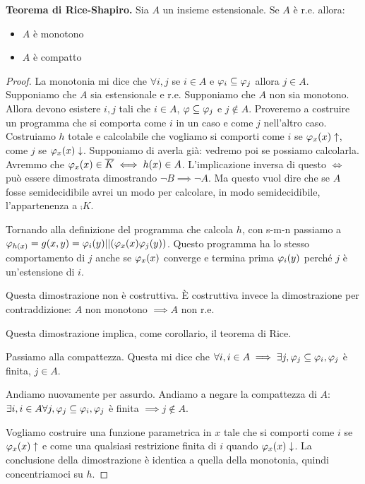\begin{thm}
    \textbf{Teorema di Rice-Shapiro. }Sia $A$ un insieme estensionale. Se $A$ è r.e. allora:
    \begin{itemize}
        \item $A$ è monotono
        \item $A$ è compatto
    \end{itemize}
\end{thm}
\begin{proof}
    La monotonia mi dice che $\forall i,j$ se $i \in A$ e $\varphi_{i} \subseteq \varphi_{j}$ allora $j \in
    A$. Supponiamo che $A$ sia estensionale e r.e. Supponiamo che $A$ non sia monotono. Allora
    devono esistere $i,j$ tali che $i \in A$, $\varphi \subseteq \varphi_{j}$ e $j \notin A$. Proveremo a
    costruire un programma che si comporta come $i$ in un caso e come $j$ nell'altro caso.
    Costruiamo $h$ totale e calcolabile che vogliamo si comporti come $i$ se $\varphi_{x}(x) \uparrow$,
    come $j$ se $\varphi_{x}(x) \downarrow$. Supponiamo di averla già: vedremo poi se possiamo
    calcolarla. Avremmo che $\varphi_{x}(x) \in \overline{K} \iff h(x) \in A$. L'implicazione inversa di questo
    $\iff$ può essere dimostrata dimostrando $\lnot B \implies \lnot A$. Ma questo vuol dire che se
    $A$ fosse semidecidibile avrei un modo per calcolare, in modo semidecidibile, l'appartenenza a
    $\comp{K}$. 

    Tornando alla definizione del programma che calcola $h$, con s-m-n passiamo a $\varphi_{h(x)} = g(x,y)
    = \varphi_{i}(y) || (\varphi_{x}(x)\varphi_{j}(y))$. Questo programma ha lo stesso comportamento di $j$ anche se
    $\varphi_{x}(x)$ converge e termina prima $\varphi_{i}(y)$ perché $j$ è un'estensione di $i$. 

    Questa dimostrazione non è costruttiva. È costruttiva invece la dimostrazione per
    contraddizione: $A$ non monotono $\implies A$ non r.e.

    Questa dimostrazione implica, come corollario, il teorema di Rice.

    Passiamo alla compattezza. Questa mi dice che $\forall i, i \in A \implies \exists j, \varphi_{j} \subseteq
    \varphi_{i}, \varphi_{j}$ è finita, $j \in A$.

    Andiamo nuovamente per assurdo. Andiamo a negare la compattezza di $A$: $\exists i, i \in A
    \forall j, \varphi_{j} \subseteq \varphi_{i}, \varphi_{j}$ è finita $\implies j \notin A$.

    Vogliamo costruire una funzione parametrica in $x$ tale che si comporti come $i$ se $\varphi_{x}(x)
    \uparrow$ e come una qualsiasi restrizione finita di $i$ quando $\varphi_{x}(x) \downarrow$. La
    conclusione della dimostrazione è identica a quella della monotonia, quindi concentriamoci su
    $h$. 


\end{proof}
